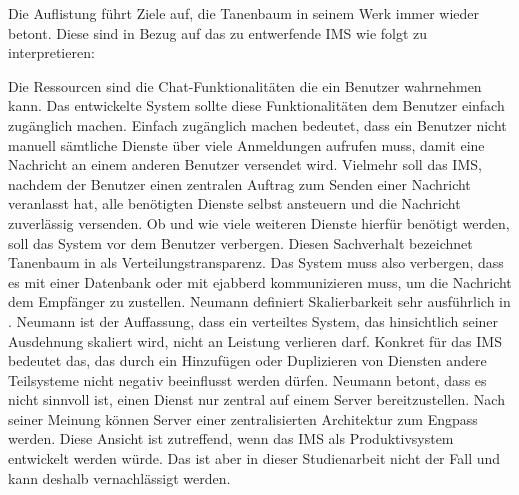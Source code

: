 \documentclass[a4paper,titlepage,halfparskip,12pt]{scrreprt}
\begin{document}
\begin{onehalfspacing}
Die Auflistung führt Ziele auf, die Tanenbaum \cite{andrew2008verteilte} in seinem Werk immer wieder betont. Diese sind in Bezug auf das zu entwerfende \ac{IMS} wie folgt zu interpretieren:

Die Ressourcen sind die Chat-Funktionalitäten die ein Benutzer wahrnehmen kann. Das entwickelte System sollte diese Funktionalitäten dem Benutzer einfach zugänglich machen. Einfach zugänglich machen bedeutet, dass ein Benutzer nicht manuell sämtliche Dienste über viele Anmeldungen aufrufen muss, damit eine Nachricht an einem anderen Benutzer versendet wird. Vielmehr soll das \ac{IMS}, nachdem der Benutzer einen zentralen Auftrag zum Senden einer Nachricht veranlasst hat, alle benötigten Dienste selbst ansteuern und die Nachricht zuverlässig versenden. Ob und wie viele weiteren Dienste hierfür benötigt werden, soll das System vor dem Benutzer verbergen. Diesen Sachverhalt bezeichnet Tanenbaum in \cite{andrew2008verteilte} als Verteilungstransparenz. Das System muss also verbergen, dass es mit einer Datenbank oder mit ejabberd kommunizieren muss, um die Nachricht dem Empfänger zu zustellen. Neumann  definiert Skalierbarkeit sehr ausführlich in \cite{neumannDistributed1994}. Neumann ist der Auffassung, dass ein verteiltes System, das hinsichtlich seiner Ausdehnung skaliert wird, nicht an Leistung verlieren darf. Konkret für das \ac{IMS} bedeutet das, das durch ein Hinzufügen oder Duplizieren von Diensten andere Teilsysteme nicht negativ beeinflusst werden dürfen. Neumann betont, dass es nicht sinnvoll ist, einen Dienst nur zentral auf einem Server bereitzustellen. Nach seiner Meinung können Server einer zentralisierten Architektur zum Engpass werden. Diese Ansicht ist zutreffend, wenn das \ac{IMS} als Produktivsystem entwickelt werden würde. Das ist aber in dieser Studienarbeit nicht der Fall und kann deshalb vernachlässigt werden.


\end{onehalfspacing}
\end{document}
